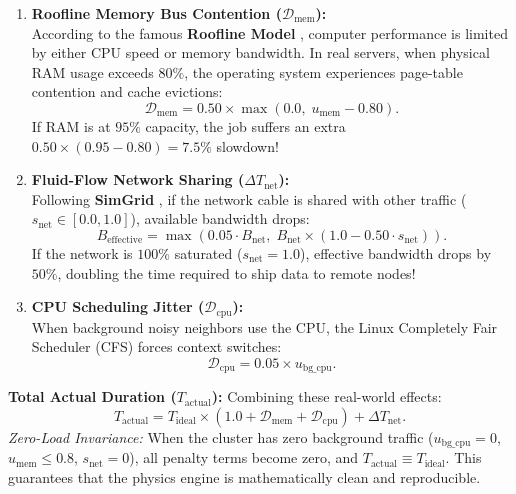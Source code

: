 \documentclass[11pt,a4paper]{article}
\begin{document}
\begin{enumerate}[noitemsep, topsep=2pt]
    \item \textbf{Roofline Memory Bus Contention ($\mathcal{D}_{\text{mem}}$):}\\
    According to the famous \textbf{Roofline Model} \cite{williams2009roofline}, computer performance is limited by either CPU speed or memory bandwidth. In real servers, when physical RAM usage exceeds $80\%$, the operating system experiences page-table contention and cache evictions:
    \begin{equation}
        \mathcal{D}_{\text{mem}} = 0.50 \times \max\left(0.0, \; u_{\text{mem}} - 0.80\right).
    \end{equation}
    If RAM is at $95\%$ capacity, the job suffers an extra $0.50 \times (0.95 - 0.80) = 7.5\%$ slowdown!
    
    \item \textbf{Fluid-Flow Network Sharing ($\Delta T_{\text{net}}$):}\\
    Following \textbf{SimGrid} \cite{casanova2014simgrid}, if the network cable is shared with other traffic ($s_{\text{net}} \in [0.0, 1.0]$), available bandwidth drops:
    \begin{equation}
        B_{\text{effective}} = \max\left(0.05 \cdot B_{\text{net}}, \; B_{\text{net}} \times (1.0 - 0.50 \cdot s_{\text{net}})\right).
    \end{equation}
    If the network is $100\%$ saturated ($s_{\text{net}}=1.0$), effective bandwidth drops by $50\%$, doubling the time required to ship data to remote nodes!
    
    \item \textbf{CPU Scheduling Jitter ($\mathcal{D}_{\text{cpu}}$):}\\
    When background noisy neighbors use the CPU, the Linux Completely Fair Scheduler (CFS) forces context switches:
    \begin{equation}
        \mathcal{D}_{\text{cpu}} = 0.05 \times u_{\text{bg\_cpu}}.
    \end{equation}
\end{enumerate}

\noindent \textbf{Total Actual Duration ($T_{\text{actual}}$):} Combining these real-world effects:
\begin{equation}
    T_{\text{actual}} = T_{\text{ideal}} \times \left(1.0 + \mathcal{D}_{\text{mem}} + \mathcal{D}_{\text{cpu}}\right) + \Delta T_{\text{net}}.
\end{equation}
\textit{Zero-Load Invariance:} When the cluster has zero background traffic ($u_{\text{bg\_cpu}} = 0$, $u_{\text{mem}} \le 0.8$, $s_{\text{net}} = 0$), all penalty terms become zero, and $T_{\text{actual}} \equiv T_{\text{ideal}}$. This guarantees that the physics engine is mathematically clean and reproducible.
\end{document}
